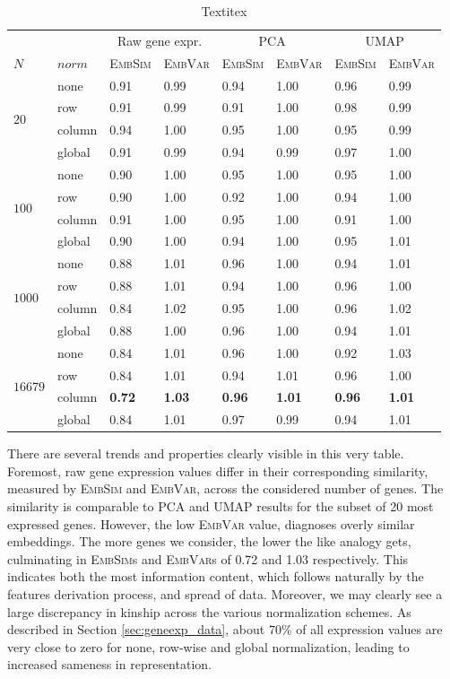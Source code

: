 \documentclass[]{article}
\begin{document}
\begin{table}
	\centering
	\renewcommand{\arraystretch}{1.2}
	
	\begin{tabular}{ll|l|l|l|l|l|l|}
		
		&&\multicolumn{2}{c|}{Raw gene expr. }&\multicolumn{2}{c|}{PCA}&\multicolumn{2}{c|}{UMAP}\\
		$N$&$norm$&\textsc{EmbSim}&\textsc{EmbVar}&\textsc{EmbSim}&\textsc{EmbVar}&\textsc{EmbSim}&\textsc{EmbVar}\\
		\hline
		\multirow{4}{*}{$20$}&none&0.91&0.99&0.94&1.00&0.96&0.99\\
		&row&0.91&0.99&0.91&1.00&0.98&0.99\\
		&column&0.94&1.00&0.95&1.00&0.95&0.99\\
		&global&0.91&0.99&0.94&0.99&0.97&1.00\\
		\hline
		\multirow{4}{*}{$100$}&none&0.90&1.00&0.95&1.00&0.95&1.00\\
		&row&0.90&1.00&0.92&1.00&0.94&1.00\\
		&column&0.91&1.00&0.95&1.00&0.91&1.00\\
		&global&0.90&1.00&0.94&1.00&0.95&1.01\\
		\hline
		\multirow{4}{*}{$1000$}&none&0.88&1.01&0.96&1.00&0.94&1.01\\
		&row&0.88&1.01&0.94&1.00&0.96&1.00\\
		&column&0.84&1.02&0.95&1.00&0.96&1.02\\
		&global&0.88&1.00&0.96&1.00&0.94&1.01\\
		\hline
		\multirow{4}{*}{$16679$}&none&0.84&1.01&0.96&1.00&0.92&1.03\\
		&row&0.84&1.01&0.94&1.01&0.96&1.00\\
		&column&\textbf{0.72}&\textbf{1.03}&\textbf{0.96}&\textbf{1.01}&\textbf{0.96}&\textbf{1.01}\\
		&global&0.84&1.01&0.97&0.99&0.94&1.01\\
		
		
	\end{tabular}
	\caption{Textitex}
	\label{tab:gen_red_baseline}
\end{table}

There are several trends and properties clearly visible in this very table. Foremost, raw gene expression values differ in their corresponding similarity, measured by \textsc{EmbSim} and \textsc{EmbVar}, across the considered number of genes. The similarity is comparable to PCA and UMAP results for the subset of 20 most expressed genes. However, the low \textsc{EmbVar} value, diagnoses overly similar embeddings. The more genes we consider, the lower the like analogy gets, culminating in \textsc{EmbSim}s and \textsc{EmbVar}s of 0.72 and 1.03 respectively. This indicates both the most information content, which follows naturally by the features derivation process, and spread of data. 
Moreover, we may clearly see a large discrepancy in kinship across the various normalization schemes. As described in Section \ref{sec:geneexp_data}, about 70\% of all expression values are very close to zero for none, row-wise and global normalization, leading to increased sameness in representation. \\
\end{document}
